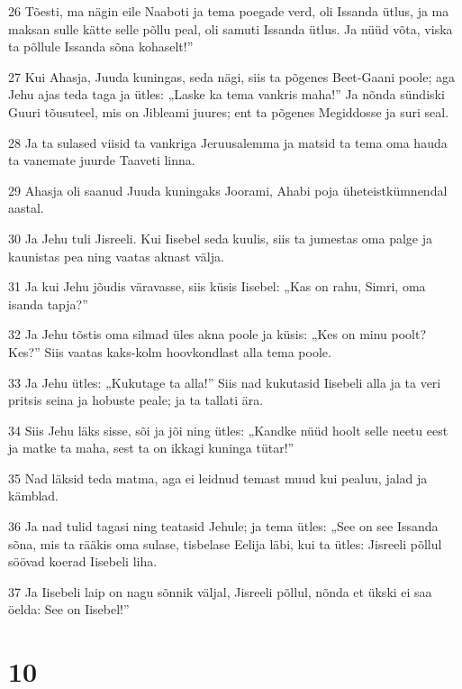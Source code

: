 \par 26 Tõesti, ma nägin eile Naaboti ja tema poegade verd, oli Issanda ütlus, ja ma maksan sulle kätte selle põllu peal, oli samuti Issanda ütlus. Ja nüüd võta, viska ta põllule Issanda sõna kohaselt!”
\par 27 Kui Ahasja, Juuda kuningas, seda nägi, siis ta põgenes Beet-Gaani poole; aga Jehu ajas teda taga ja ütles: „Laske ka tema vankris maha!” Ja nõnda sündiski Guuri tõusuteel, mis on Jibleami juures; ent ta põgenes Megiddosse ja suri seal.
\par 28 Ja ta sulased viisid ta vankriga Jeruusalemma ja matsid ta tema oma hauda ta vanemate juurde Taaveti linna.
\par 29 Ahasja oli saanud Juuda kuningaks Joorami, Ahabi poja üheteistkümnendal aastal.
\par 30 Ja Jehu tuli Jisreeli. Kui Iisebel seda kuulis, siis ta jumestas oma palge ja kaunistas pea ning vaatas aknast välja.
\par 31 Ja kui Jehu jõudis väravasse, siis küsis Iisebel: „Kas on rahu, Simri, oma isanda tapja?”
\par 32 Ja Jehu tõstis oma silmad üles akna poole ja küsis: „Kes on minu poolt? Kes?” Siis vaatas kaks-kolm hoovkondlast alla tema poole.
\par 33 Ja Jehu ütles: „Kukutage ta alla!” Siis nad kukutasid Iisebeli alla ja ta veri pritsis seina ja hobuste peale; ja ta tallati ära.
\par 34 Siis Jehu läks sisse, sõi ja jõi ning ütles: „Kandke nüüd hoolt selle neetu eest ja matke ta maha, sest ta on ikkagi kuninga tütar!”
\par 35 Nad läksid teda matma, aga ei leidnud temast muud kui pealuu, jalad ja kämblad.
\par 36 Ja nad tulid tagasi ning teatasid Jehule; ja tema ütles: „See on see Issanda sõna, mis ta rääkis oma sulase, tisbelase Eelija läbi, kui ta ütles: Jisreeli põllul söövad koerad Iisebeli liha.
\par 37 Ja Iisebeli laip on nagu sõnnik väljal, Jisreeli põllul, nõnda et ükski ei saa öelda: See on Iisebel!”

\chapter{10}

